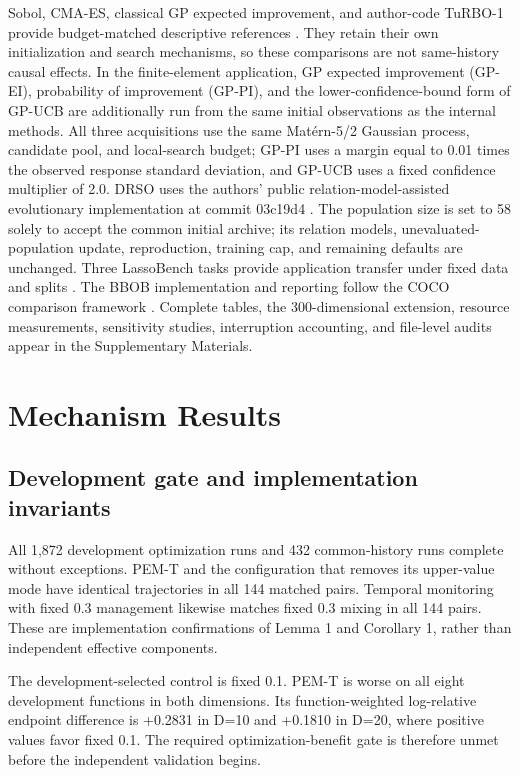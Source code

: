 \documentclass[]{interact}
\begin{document}
Sobol, CMA-ES, classical GP expected improvement, and author-code TuRBO-1 provide budget-matched descriptive references \citep{ref25}. They retain their own initialization and search mechanisms, so these comparisons are not same-history causal effects. In the finite-element application, GP expected improvement (GP-EI), probability of improvement (GP-PI), and the lower-confidence-bound form of GP-UCB are additionally run from the same initial observations as the internal methods. All three acquisitions use the same Matérn-5/2 Gaussian process, candidate pool, and local-search budget; GP-PI uses a margin equal to 0.01 times the observed response standard deviation, and GP-UCB uses a fixed confidence multiplier of 2.0. DRSO uses the authors' public relation-model-assisted evolutionary implementation at commit 03c19d4 \citep{ref30}. The population size is set to 58 solely to accept the common initial archive; its relation models, unevaluated-population update, reproduction, training cap, and remaining defaults are unchanged. Three LassoBench tasks provide application transfer under fixed data and splits \citep{ref24}. The BBOB implementation and reporting follow the COCO comparison framework \citep{ref26}. Complete tables, the 300-dimensional extension, resource measurements, sensitivity studies, interruption accounting, and file-level audits appear in the Supplementary Materials.

\hypertarget{mechanism-results}{%
\section{Mechanism Results}\label{mechanism-results}}

\hypertarget{development-gate-and-implementation-invariants}{%
\subsection{Development gate and implementation invariants}\label{development-gate-and-implementation-invariants}}

All 1,872 development optimization runs and 432 common-history runs complete without exceptions. PEM-T and the configuration that removes its upper-value mode have identical trajectories in all 144 matched pairs. Temporal monitoring with fixed 0.3 management likewise matches fixed 0.3 mixing in all 144 pairs. These are implementation confirmations of Lemma 1 and Corollary 1, rather than independent effective components.

The development-selected control is fixed 0.1. PEM-T is worse on all eight development functions in both dimensions. Its function-weighted log-relative endpoint difference is +0.2831 in D=10 and +0.1810 in D=20, where positive values favor fixed 0.1. The required optimization-benefit gate is therefore unmet before the independent validation begins.
\end{document}
